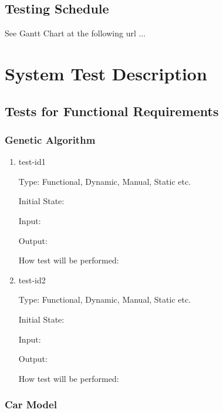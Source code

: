 \documentclass[12pt, titlepage]{article}
\begin{document}
\subsection{Testing Schedule}
		
See Gantt Chart at the following url ...

\section{System Test Description}
	
\subsection{Tests for Functional Requirements}

\subsubsection{Genetic Algorithm}

\begin{enumerate}

\item{test-id1\\}

Type: Functional, Dynamic, Manual, Static etc.
					
Initial State: 
					
Input: 
					
Output: 
					
How test will be performed: 
					
\item{test-id2\\}

Type: Functional, Dynamic, Manual, Static etc.
					
Initial State: 
					
Input: 
					
Output: 
					
How test will be performed: 

\end{enumerate}

\subsubsection{Car Model}
\end{document}
